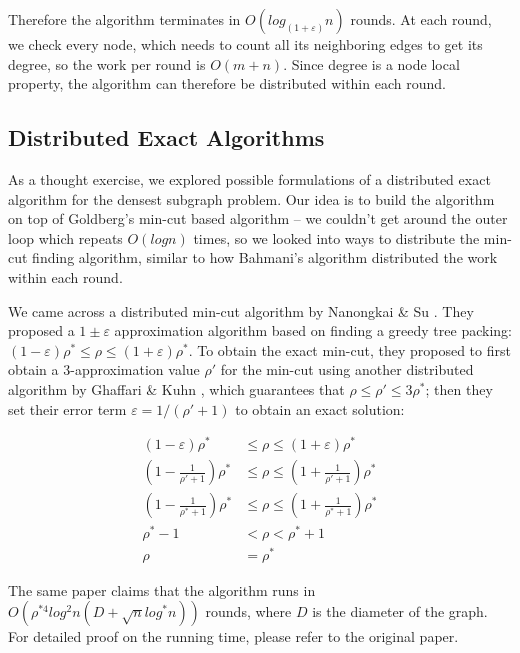 \documentclass{article}
\begin{document}
Therefore the algorithm terminates in $O(log_{(1+\varepsilon)}n)$ rounds. At each round, we check every node, which needs to count all its neighboring edges to get its degree, so the work per round is $O(m+n)$. Since degree is a node local property, the algorithm can therefore be distributed within each round.

\subsection{Distributed Exact Algorithms}
As a thought exercise, we explored possible formulations of a distributed exact algorithm for the densest subgraph problem. Our idea is to build the algorithm on top of Goldberg's min-cut based algorithm – we couldn't get around the outer loop which repeats $O(logn)$ times, so we looked into ways to distribute the min-cut finding algorithm, similar to how Bahmani's algorithm distributed the work within each round.

We came across a distributed min-cut algorithm by Nanongkai \& Su \cite{DBLP:journals/corr/NanongkaiS14}. They proposed a $1 \pm \varepsilon$ approximation algorithm based on finding a greedy tree packing: $(1 - \varepsilon) \rho^* \leq \rho \leq (1 + \varepsilon) \rho^*$. To obtain the exact min-cut, they proposed to first obtain a 3-approximation value $\rho'$ for the min-cut using another distributed algorithm by Ghaffari \& Kuhn \cite{DBLP:journals/corr/abs-1305-5520}, which guarantees that $\rho \leq \rho' \leq 3\rho^*$; then they set their error term $\varepsilon = 1/(\rho'+1)$ to obtain an exact solution:

\begin{equation}
  \begin{split}
      (1 - \varepsilon) \rho^* & \leq \rho \leq (1 + \varepsilon) \rho^* \\
      (1 - \frac{1}{\rho' + 1}) \rho^* & \leq \rho \leq (1 + \frac{1}{\rho' + 1}) \rho^* \\
      (1 - \frac{1}{\rho^* + 1}) \rho^* & \leq \rho \leq (1 + \frac{1}{\rho^* + 1}) \rho^* \\
      \rho^* - 1 & < \rho < \rho^* + 1 \\
      \rho & = \rho^*
  \end{split}
\end{equation}

The same paper claims that the algorithm runs in $O(\rho^{*4} log^2n (D + \sqrt{n} log^*n))$ rounds, where $D$ is the diameter of the graph. For detailed proof on the running time, please refer to the original paper.
\end{document}
